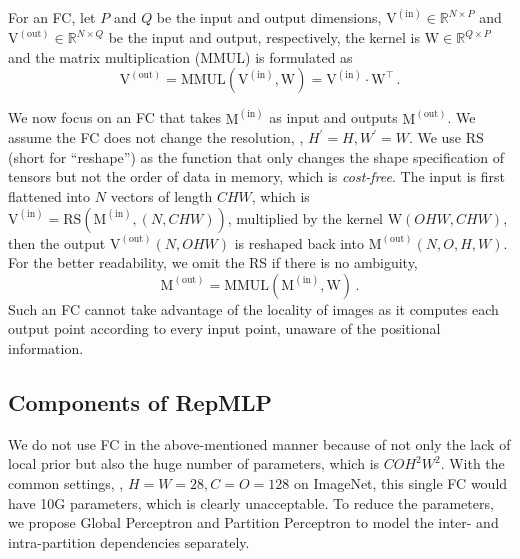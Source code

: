 \documentclass[10pt,twocolumn,letterpaper]{article}
\begin{document}
For an FC, let $P$ and $Q$ be the input and output dimensions, $\mathrm{V}^{(\text{in})}\in\mathbb{R}^{N\times P}$ and $\mathrm{V}^{(\text{out})}\in\mathbb{R}^{N\times Q}$ be the input and output, respectively, the kernel is $\mathrm{W}\in\mathbb{R}^{Q\times P}$ and the matrix multiplication (MMUL) is formulated as 
\begin{equation}\label{eq-formulation-v}
	\mathrm{V}^{(\text{out})} = \text{MMUL}(\mathrm{V}^{(\text{in})}, \mathrm{W})=\mathrm{V}^{(\text{in})}\cdot\mathrm{W}^\intercal \,.
\end{equation}

We now focus on an FC that takes $\mathrm{M}^{(\text{in})}$ as input and outputs $\mathrm{M}^{(\text{out})}$. We assume the FC does not change the resolution, \ie, $H^\prime=H, W^\prime=W$. We use $\text{RS}$ (short for ``reshape'') as the function that only changes the shape specification of tensors but not the order of data in memory, which is \textit{cost-free}. The input is first flattened into $N$ vectors of length $CHW$, which is $\mathrm{V}^{(\text{in})}=\text{RS}(\mathrm{M}^{(\text{in})}, (N,CHW))$, multiplied by the kernel $\mathrm{W}(OHW, CHW)$, then the output $\mathrm{V}^{(\text{out})}(N, OHW)$ is reshaped back into $\mathrm{M}^{(\text{out})}(N,O,H,W)$. For the better readability, we omit the RS if there is no ambiguity, 
\begin{equation}
	\mathrm{M}^{(\text{out})}=\text{MMUL}(\mathrm{M}^{(\text{in})},\mathrm{W}) \,.
\end{equation}
Such an FC cannot take advantage of the locality of images as it computes each output point according to every input point, unaware of the positional information.



\subsection{Components of RepMLP}




We do not use FC in the above-mentioned manner because of not only the lack of local prior but also the huge number of parameters, which is $COH^2W^2$. With the common settings, \eg, $H=W=28,C=O=128$ on ImageNet, this single FC would have 10G parameters, which is clearly unacceptable. To reduce the parameters, we propose Global Perceptron and Partition Perceptron to model the inter- and intra-partition dependencies separately.
\end{document}

